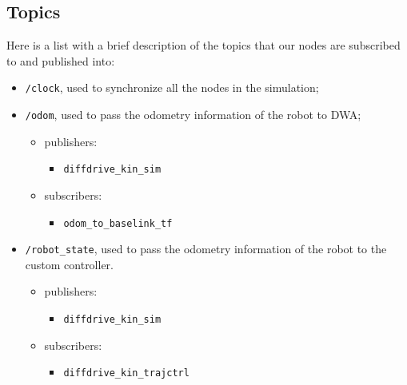 \documentclass[11pt,a4paper]{article}
\begin{document}

\subsection{Topics}

Here is a list with a brief description of the topics that our nodes are subscribed to and published into:\\

\begin{itemize}

    \item \texttt{/clock}, used to synchronize all the nodes in the simulation;

    \item \texttt{/odom}, used to pass the odometry information of the robot to DWA;
        \begin{itemize}
            \item publishers:
                \begin{itemize}
                    \item \texttt{diffdrive\_kin\_sim}
                \end{itemize}
            \item subscribers:
                \begin{itemize}
                    \item \texttt{odom\_to\_baselink\_tf}
                \end{itemize}
        \end{itemize}

    \item \texttt{/robot\_state}, used to pass the odometry information of the robot to the custom controller.
        \begin{itemize}
            \item publishers:
                \begin{itemize}
                    \item \texttt{diffdrive\_kin\_sim}
                \end{itemize}
            \item subscribers:
                \begin{itemize}
                    \item \texttt{diffdrive\_kin\_trajctrl}
                \end{itemize}
        \end{itemize}


\end{itemize}
\end{document}
